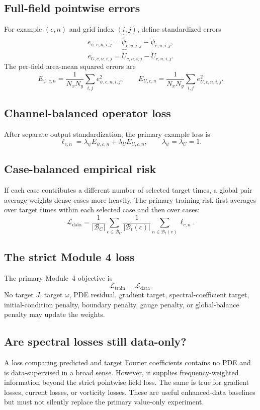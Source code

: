\documentclass[11pt]{article}
\newcommand{\Ldata}{\mathcal{L}_{\mathrm{data}}}
\newcommand{\Ltrain}{\mathcal{L}_{\mathrm{train}}}
\begin{document}
\subsection{Full-field pointwise errors}
For example $(c,n)$ and grid index $(i,j)$, define standardized errors
\[
e_{\psi,c,n,i,j}=\widehat{\widetilde\psi}_{c,n,i,j}-\widetilde\psi_{c,n,i,j},
\]
\[
e_{U,c,n,i,j}=\widehat{\widetilde U}_{c,n,i,j}-\widetilde U_{c,n,i,j}.
\]
The per-field area-mean squared errors are
\[
E_{\psi,c,n}=\frac{1}{N_xN_y}\sum_{i,j}e_{\psi,c,n,i,j}^2,
\qquad
E_{U,c,n}=\frac{1}{N_xN_y}\sum_{i,j}e_{U,c,n,i,j}^2.
\]

\subsection{Channel-balanced operator loss}
After separate output standardization, the primary example loss is
\[
\ell_{c,n}=\lambda_\psi E_{\psi,c,n}+\lambda_U E_{U,c,n},
\qquad \lambda_\psi=\lambda_U=1.
\]

\subsection{Case-balanced empirical risk}
If each case contributes a different number of selected target times, a global pair average weights dense cases more heavily. The primary training risk first averages over target times within each selected case and then over cases:
\begin{equation}
\Ldata=
\frac{1}{|\mathcal B_C|}
\sum_{c\in\mathcal B_C}
\frac{1}{|\mathcal B_t(c)|}
\sum_{n\in\mathcal B_t(c)}\ell_{c,n}.
\label{eq:case_balanced_loss}
\end{equation}

\subsection{The strict Module 4 loss}
\begin{conventionbox}
The primary Module~4 objective is
\[
\boxed{\Ltrain=\Ldata.}
\]
No target $J$, target $\omega$, PDE residual, gradient target, spectral-coefficient target, initial-condition penalty, boundary penalty, gauge penalty, or global-balance penalty may update the weights.
\end{conventionbox}

\subsection{Are spectral losses still data-only?}
A loss comparing predicted and target Fourier coefficients contains no PDE and is data-supervised in a broad sense. However, it supplies frequency-weighted information beyond the strict pointwise field loss. The same is true for gradient losses, current losses, or vorticity losses. These are useful enhanced-data baselines but must not silently replace the primary value-only experiment.
\end{document}
